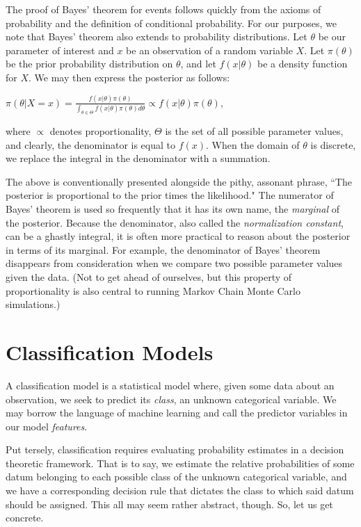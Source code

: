 \documentclass[12pt,twoside]{reedthesis}
\begin{document}
	The proof of Bayes' theorem for events follows quickly from the axioms of probability and the definition of conditional probability. For our purposes, we note that Bayes' theorem also extends to probability distributions. Let $\theta$ be our parameter of interest and $x$ be an observation of a random variable $X$. Let $\pi(\theta)$ be the prior probability distribution on $\theta$, and let $f(x | \theta)$ be a density function for $X$. We may then express the posterior as follows:
\begin{center}
	$\pi(\theta | X = x) = \displaystyle\frac{f(x | \theta)\pi(\theta)}{\int_{\theta \in \Theta}f(x |\theta)\pi(\theta)d\theta} \propto f({x} | \theta)\pi(\theta)$,
\end{center}
where $\propto$ denotes proportionality, $\Theta$ is the set of all possible parameter values, and clearly, the denominator is equal to $f(x)$. When the domain of $\theta$ is discrete, we replace the integral in the denominator with a summation.

The above is conventionally presented alongside the pithy, assonant phrase, ``The posterior is proportional to the prior times the likelihood." The numerator of Bayes' theorem is used so frequently that it has its own name, the {\em marginal} of the posterior. Because the denominator, also called the {\em normalization constant}, can be a ghastly integral, it is often more practical to reason about the posterior in terms of its marginal. For example, the denominator of Bayes' theorem disappears from consideration when we compare two possible parameter values given the data. (Not to get ahead of ourselves, but this property of proportionality is also central to running Markov Chain Monte Carlo simulations.)

\section{Classification Models}

A classification model is a statistical model where, given some data about an observation, we seek to predict its {\em class}, an unknown categorical variable. We may borrow the language of machine learning and call the predictor variables in our model {\em features}.

Put tersely, classification requires evaluating probability estimates in a decision theoretic framework. That is to say, we estimate the relative probabilities of some datum belonging to each possible class of the unknown categorical variable, and we have a corresponding decision rule that dictates the class to which said datum should be assigned. This all may seem rather abstract, though. So, let us get concrete.
\end{document}
